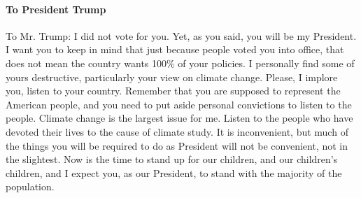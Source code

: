 \documentclass[twoside]{article}
\begin{document}
              \paragraph{To President Trump} To Mr. Trump: I did not vote for you. Yet, as you said, you will be my President. I want you to keep in mind that just because people voted
              you into office, that does not mean the country wants 100\% of your policies. I personally find some of yours destructive, particularly your view on climate change. Please,
              I implore you, listen to your country. Remember that you are supposed to represent the American people, and you need to put aside personal convictions to listen to the people.
              Climate change is the largest issue for me. Listen to the people who have devoted their lives to the cause of climate study. It is inconvenient, but much of the things you will
              be required to do as President will not be convenient, not in the slightest. Now is the time to stand up for our children, and our children's children, and I expect you, as our
              President, to stand with the majority of the population.
              \newpage
\end{document}
